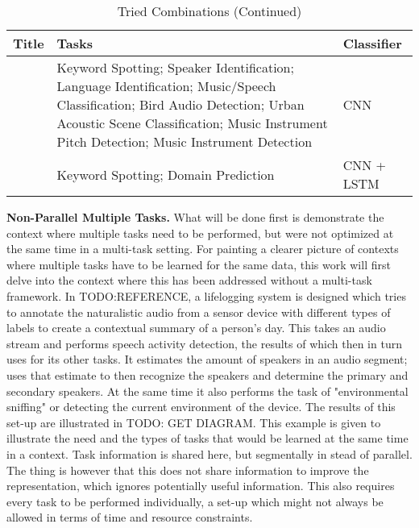 \begin{table}[ht]
\caption{Tried Combinations (Continued)} %
\centering %
\begin{tabular}{p{}p{}p{}} %
\hline\hline %
Title & Tasks & Classifier   \\ [0.5ex] %
\hline %

		\citet{tagliasacchi2020multi} & Keyword Spotting; Speaker Identification; Language Identification; Music/Speech Classification; Bird Audio Detection; Urban Acoustic Scene Classification; Music Instrument Pitch Detection; Music Instrument Detection & CNN  \\ \hline
		\citet{wu2020domain} & Keyword Spotting; Domain Prediction & CNN + LSTM \\
		[1ex] %
		\hline %
	\end{tabular}
	\label{table:combinations3} %
\end{table}

\textbf{Non-Parallel Multiple Tasks.} What will be done first is demonstrate the context where multiple tasks need to be performed, but were not optimized at the same time in a multi-task setting. For painting a clearer picture of contexts where multiple tasks have to be learned for the same data, this work will first delve into the context where this has been addressed without a multi-task framework. In TODO:REFERENCE, a lifelogging system is designed which tries to annotate the naturalistic audio from a sensor device with different types of labels to create a contextual summary of a person's day. This takes an audio stream and performs speech activity detection, the results of which then in turn uses for its other tasks. It estimates the amount of speakers in an audio segment; uses that estimate to then recognize the speakers and determine the primary and secondary speakers. At the same time it also performs the task of "environmental sniffing" or detecting the current environment of the device. The results of this set-up are illustrated in TODO: GET DIAGRAM. This example is given to illustrate the need and the types of tasks that would be learned at the same time in a context. Task information is shared here, but segmentally in stead of parallel. The thing is however that this does not share information to improve the representation, which ignores potentially useful information. This also requires every task to be performed individually, a set-up which might not always be allowed in terms of time and resource constraints.\\

